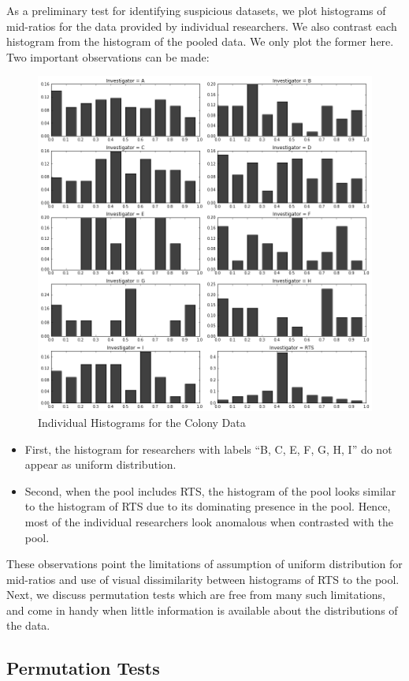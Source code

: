 \documentclass{article}
\begin{document}
    As a preliminary test for identifying suspicious datasets, we plot histograms of mid-ratios for the data provided by individual researchers. We also contrast each histogram from the histogram of the pooled data. We only plot the former here. Two important observations can be made:
\begin{figure}[H]
\centering
\includegraphics[width=0.8\linewidth]{images/new_mid_ratio.png}
\caption{Individual Histograms for the Colony Data}
\label{ind_mid_ratio}
\end{figure}

\begin{itemize}
\item
  First, the histogram for researchers with labels ``B, C, E, F, G, H, I'' do not
  appear as uniform distribution.
\item
  Second, when the pool includes RTS, the histogram of the pool looks similar to the histogram of RTS due
  to its dominating presence in the pool. Hence, most of the individual researchers look anomalous when 
  contrasted with the pool.
\end{itemize}

These observations point the limitations of assumption of uniform distribution for
mid-ratios and use of visual dissimilarity between histograms of RTS to the pool. Next, we discuss
permutation tests which are free from many such limitations, and come in handy when
little information is available about the distributions of the data.



    \subsection{Permutation Tests}\label{quick-primer-to-permutation-tests}
\end{document}
